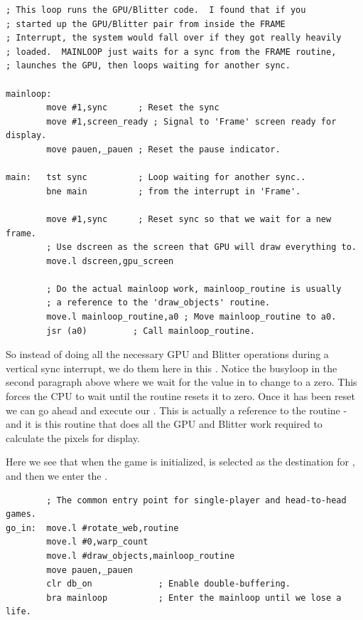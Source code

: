 \begin{lstlisting}[escapechar=\%]
; This loop runs the GPU/Blitter code.  I found that if you
; started up the GPU/Blitter pair from inside the FRAME
; Interrupt, the system would fall over if they got really heavily
; loaded.  MAINLOOP just waits for a sync from the FRAME routine,
; launches the GPU, then loops waiting for another sync.

mainloop:
        move #1,sync      ; Reset the sync
        move #1,screen_ready ; Signal to 'Frame' screen ready for display.
        move pauen,_pauen ; Reset the pause indicator.
    
main:   tst sync          ; Loop waiting for another sync..
        bne main          ; from the interrupt in 'Frame'.
    
        move #1,sync      ; Reset sync so that we wait for a new frame.
        ; Use dscreen as the screen that GPU will draw everything to.
        move.l dscreen,gpu_screen  
    
        ; Do the actual mainloop work, mainloop_routine is usually 
        ; a reference to the 'draw_objects' routine.
        move.l mainloop_routine,a0 ; Move mainloop_routine to a0. 
        jsr (a0)         ; Call mainloop_routine. 
\end{lstlisting}

So instead of doing all the necessary GPU and Blitter operations during a vertical sync interrupt, we do them
here in this . Notice the busyloop in the second paragraph above where we wait for the value in 
to change to a zero. This forces the CPU to wait until the  routine resets it to zero. Once it has
been reset we can go ahead and execute our . This is actually a reference to the 
 routine - and it is this routine that does all the GPU and Blitter work required to calculate
the pixels for display.

Here we see that when the game is initialized,  is selected as the destination for
, and then we enter the .
\begin{lstlisting}
        ; The common entry point for single-player and head-to-head games.
go_in:  move.l #rotate_web,routine
        move.l #0,warp_count
        move.l #draw_objects,mainloop_routine
        move pauen,_pauen
        clr db_on             ; Enable double-buffering.
        bra mainloop          ; Enter the mainloop until we lose a life.
\end{lstlisting}


